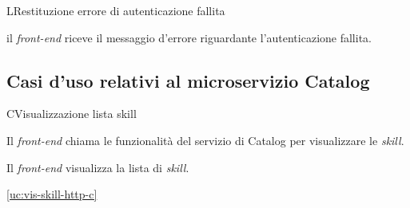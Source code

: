 \begin{usecase}{13}{L}{Restituzione errore di autenticazione fallita}



	\begin{ucscenarioprincipale}
		\item il \textit{front-end} riceve il messaggio d'errore riguardante l'autenticazione fallita.
	\end{ucscenarioprincipale}


	\label{uc:vis-errore-auth-l}

\end{usecase}


\subsection{Casi d'uso relativi al microservizio Catalog}

\begin{usecase}{1}{C}{Visualizzazione lista skill}



	\begin{ucscenarioprincipale}
		\item Il \textit{front-end} chiama le funzionalità del servizio di Catalog per visualizzare le \textit{skill}.
		\item Il \textit{front-end} visualizza la lista di \textit{skill}.
	\end{ucscenarioprincipale}


	\begin{ucgeneralizzazioni}
		\item \ref{uc:vis-skill-http-c}
	\end{ucgeneralizzazioni}

	\label{uc:vis-skill-c}
\end{usecase}

